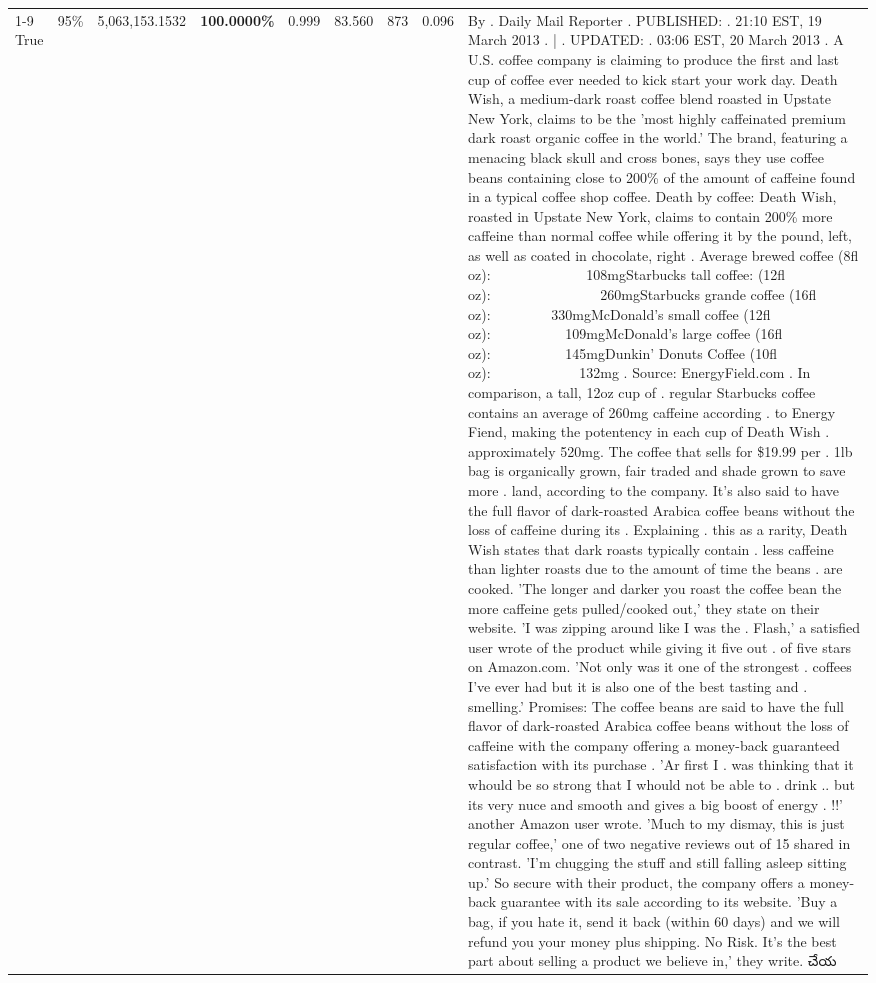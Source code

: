 \begin{table}[H]
{\begin{tabular}{lllrlllll}
\cline{1-9} \cline{2-9}
True & 95\% & 5,063,153.1532 & \bfseries \color{red} 100.0000\% & 0.999 & 83.560 & 873 & 0.096 & By . Daily Mail Reporter . PUBLISHED: . 21:10 EST, 19 March 2013 . | . UPDATED: . 03:06 EST, 20 March 2013 . A U.S. coffee company is claiming to produce the first and last cup of coffee ever needed to kick start your work day. Death Wish, a medium-dark roast coffee blend roasted in Upstate New York, claims to be the 'most highly caffeinated premium dark roast organic coffee in the world.' The brand, featuring a menacing black skull and cross bones, says they use coffee beans containing close to 200\% of the amount of caffeine found in a typical coffee shop coffee. Death by coffee: Death Wish, roasted in Upstate New York, claims to contain 200\% more caffeine than normal coffee while offering it by the pound, left, as well as coated in chocolate, right . Average brewed coffee (8fl oz):              108mgStarbucks tall coffee: (12fl oz):                260mgStarbucks grande coffee (16fl oz):         330mgMcDonald's small coffee (12fl oz):           109mgMcDonald's large coffee (16fl oz):           145mgDunkin' Donuts Coffee (10fl oz):             132mg . Source: EnergyField.com . In comparison, a tall, 12oz cup of . regular Starbucks coffee contains an average of 260mg caffeine according . to Energy Fiend, making the potentency in each cup of Death Wish . approximately 520mg. The coffee that sells for \$19.99 per . 1lb bag is organically grown, fair traded and shade grown to save more . land, according to the company. It's also said to have the full flavor of dark-roasted Arabica coffee beans without the loss of caffeine during its . Explaining . this as a rarity, Death Wish states that dark roasts typically contain . less caffeine than lighter roasts due to the amount of time the beans . are cooked. 'The longer and darker you roast the coffee bean the more caffeine gets pulled/cooked out,' they state on their website. 'I was zipping around like I was the . Flash,' a satisfied user wrote of the product while giving it five out . of five stars on Amazon.com. 'Not only was it one of the strongest . coffees I've ever had but it is also one of the best tasting and . smelling.’ Promises: The coffee beans are said to have the full flavor of dark-roasted Arabica coffee beans without the loss of caffeine with the company offering a money-back guaranteed satisfaction with its purchase . 'Ar first I . was thinking that it whould be so strong that I whould not be able to . drink .. but its very nuce and smooth and gives a big boost of energy . !!' another Amazon user wrote. 'Much to my dismay, this is just regular coffee,' one of two negative reviews out of 15 shared in contrast. 'I'm chugging the stuff and still falling asleep sitting up.' So secure with their product, the company offers a money-back guarantee with its sale according to its website. 'Buy a bag, if you hate it, send it back (within 60 days) and we will refund you your money plus shipping. No Risk. It’s the best part about selling a product we believe in,' they write. చేయ \\

\end{tabular}}
\end{table}
